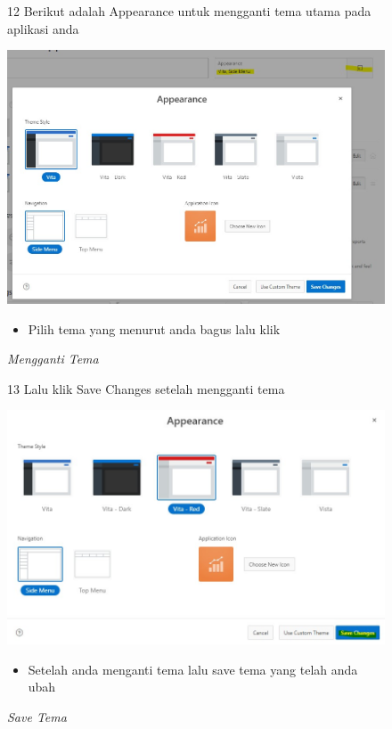 \begin{itemize}
        \begin{figure}[!htbp]
        \item[12]Berikut adalah Appearance untuk mengganti tema utama pada aplikasi anda
        \begin{center}
        \includegraphics[scale=0.4]{figures/untuk_mengganti_tema.jpg}
        \caption{\textit{Mengganti Tema}}
        \end{center}
        \begin{itemize}
            \item Pilih tema yang menurut anda bagus lalu klik
        \end{itemize}
        \end{figure}
        
        \begin{figure}[!htbp]
        \item[13]Lalu klik Save Changes setelah mengganti tema
        \begin{center}
        \includegraphics[scale=0.4]{figures/pilih_tema_lalu_klik_save_changes.jpg}
        \caption{\textit{Save Tema}}
        \end{center}
        \begin{itemize}
            \item Setelah anda menganti tema lalu save tema yang telah anda ubah 
        \end{itemize}
        \end{figure}
        

\end{itemize}
